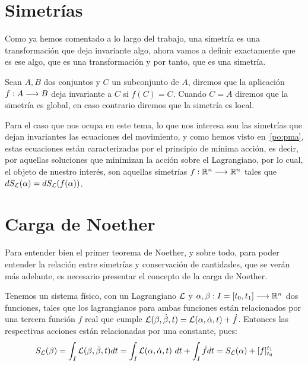 \section{Simetrías}\label{sec:simetrias}
Como ya hemos comentado a lo largo del trabajo, una simetría es una transformación que deja invariante algo, ahora vamos a definir exactamente que es ese algo, que es una transformación y por tanto, que es una simetría.

Sean $A, B$ dos conjuntos y $C$ un subconjunto de $A$, diremos que la aplicación $f:A\longrightarrow B$ deja invariante a $C$ si $f(C)=C$.
Cuando $C=A$ diremos que la simetría es global, en caso contrario diremos que la simetría es local.

Para el caso que nos ocupa en este tema, lo que nos interesa son las simetrías que dejan invariantes las ecuaciones del movimiento, y como hemos visto en~\eqref{po:pma}, estas ecuaciones están caracterizadas por el principio de mínima acción, es decir, por aquellas soluciones que minimizan la acción sobre el Lagrangiano, por lo cual, el objeto de nuestro interés, son aquellas simetrías $f:\mathbb{R}^n\longrightarrow \mathbb{R}^n$ tales que $dS_{\mathcal{L}}(\alpha)=dS_{\mathcal{L}}(f(\alpha))$.

\section{Carga de Noether}\label{sec:carga-de-noether}
Para entender bien el primer teorema de Noether, y sobre todo, para poder entender la relación entre simetrías y conservación de cantidades, que se verán más adelante, es necesario presentar el concepto de la carga de Noether.

Tenemos un sistema físico, con un Lagrangiano $\mathcal{L}$ y $\alpha,\beta:I=[t_0, t_1]\longrightarrow \mathbb{R}^n$ dos funciones, tales que los lagrangianos para ambas funciones están relacionados por una tercera función $f$ real que cumple $\mathcal{L}(\beta, \dot{\beta}, t) = \mathcal{L}(\alpha, \dot{\alpha}, t)+\dot{f}$.
Entonces las respectivas acciones están relacionadas por una constante, pues:
\begin{equation}
	\label{eq:variacion-accion}
	S_{\mathcal{L}}(\beta) = \int_I \mathcal{L}(\beta, \dot{\beta}, t) dt = \int_I \mathcal{L}(\alpha, \dot{\alpha}, t)\ dt+\int_I \dot{f}dt=S_{\mathcal{L}}(\alpha) +[f]_{t_0}^{t_1}
\end{equation}

